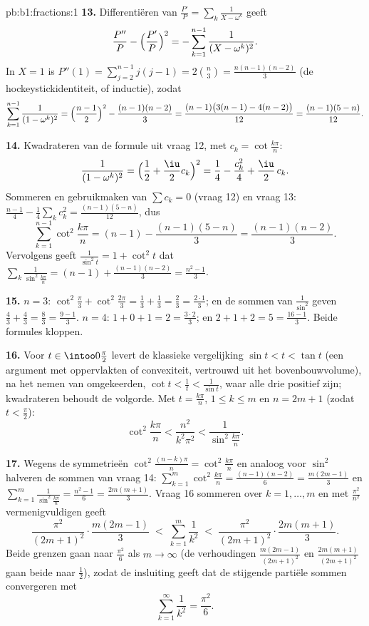 \begin{solution}{pb:b1:fractions:1}
\textbf{13.} Differentiëren van $\frac{P'}P = \sum_k\frac1{X -
\omega^k}$ geeft
\[
\frac{P''}P - \Bigl(\frac{P'}P\Bigr)^2
= -\sum_{k=1}^{n-1}\frac1{(X - \omega^k)^2} .
\]
In $X = 1$ is $P''(1) = \sum_{j=2}^{n-1}j(j-1) = 2\binom n3 =
\frac{n(n-1)(n-2)}3$ (de hockeystickidentiteit, of inductie), zodat
\[
\sum_{k=1}^{n-1}\frac1{(1 - \omega^k)^2}
= \Bigl(\frac{n-1}2\Bigr)^2 - \frac{(n-1)(n-2)}3
= \frac{(n-1)\bigl(3(n-1) - 4(n-2)\bigr)}{12}
= \frac{(n-1)(5-n)}{12} .
\]

\textbf{14.} Kwadrateren van de formule uit vraag 12, met $c_k =
\cot\frac{k\pi}n$:
\[
\frac1{(1-\omega^k)^2}
= \Bigl(\frac12 + \frac\iu2 c_k\Bigr)^2
= \frac14 - \frac{c_k^2}4 + \frac\iu2\,c_k .
\]
Sommeren en gebruikmaken van $\sum c_k = 0$ (vraag 12) en vraag 13:
$\frac{n-1}4 - \frac14\sum_k c_k^2 = \frac{(n-1)(5-n)}{12}$, dus
\[
\sum_{k=1}^{n-1}\cot^2\frac{k\pi}n
= (n-1) - \frac{(n-1)(5-n)}3 = \frac{(n-1)(n-2)}3 .
\]
Vervolgens geeft $\frac1{\sin^2t} = 1 + \cot^2t$ dat
$\sum_k\frac1{\sin^2\frac{k\pi}n} = (n-1) + \frac{(n-1)(n-2)}3 =
\frac{n^2-1}3$.

\textbf{15.} $n = 3$: $\cot^2\frac\pi3 + \cot^2\frac{2\pi}3 = \frac13 +
\frac13 = \frac23 = \frac{2\cdot1}3$; en de sommen van $\frac1{\sin^2}$
geven $\frac43 + \frac43 = \frac83 = \frac{9-1}3$. $n = 4$: $1 + 0 + 1 =
2 = \frac{3\cdot2}3$; en $2 + 1 + 2 = 5 = \frac{16-1}3$. Beide formules
kloppen.

\textbf{16.} Voor $t \in \intoo0{\frac\pi2}$ levert de klassieke
vergelijking $\sin t < t < \tan t$ (een argument met oppervlakten of
convexiteit, vertrouwd uit het bovenbouwvolume), na het nemen van
omgekeerden, $\cot t < \frac1t < \frac1{\sin t}$, waar alle drie positief
zijn; kwadrateren behoudt de volgorde. Met $t = \frac{k\pi}n$, $1 \leq k
\leq m$ en $n = 2m+1$ (zodat $t < \frac\pi2$):
\[
\cot^2\frac{k\pi}n < \frac{n^2}{k^2\pi^2} <
\frac1{\sin^2\frac{k\pi}n} .
\]

\textbf{17.} Wegens de symmetrieën $\cot^2\frac{(n-k)\pi}n =
\cot^2\frac{k\pi}n$ en analoog voor $\sin^2$ halveren de sommen van vraag
14: $\sum_{k=1}^{m}\cot^2\frac{k\pi}n = \frac{(n-1)(n-2)}6 =
\frac{m(2m-1)}3$ en $\sum_{k=1}^m\frac1{\sin^2\frac{k\pi}n} =
\frac{n^2-1}6 = \frac{2m(m+1)}3$. Vraag 16 sommeren over $k = 1, \dots,
m$ en met $\frac{\pi^2}{n^2}$ vermenigvuldigen geeft
\[
\frac{\pi^2}{(2m+1)^2}\cdot\frac{m(2m-1)}3
\;<\; \sum_{k=1}^{m}\frac1{k^2} \;<\;
\frac{\pi^2}{(2m+1)^2}\cdot\frac{2m(m+1)}3 .
\]
Beide grenzen gaan naar $\frac{\pi^2}6$ als $m \to \infty$ (de
verhoudingen $\frac{m(2m-1)}{(2m+1)^2}$ en $\frac{2m(m+1)}{(2m+1)^2}$
gaan beide naar $\frac12$), zodat de insluiting geeft dat de stijgende
partiële sommen convergeren met
\[
\sum_{k=1}^{\infty}\frac1{k^2} = \frac{\pi^2}6 .
\]


\end{solution}
